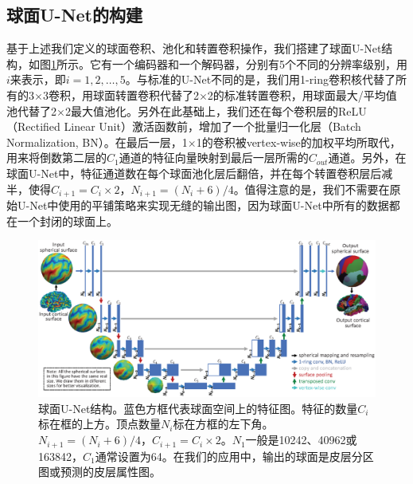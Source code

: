\subsection{球面U-Net的构建}\label{sec:球面U-Net的构建}
基于上述我们定义的球面卷积、池化和转置卷积操作，我们搭建了球面U-Net结构，如图\ref{fig:fig_unet}所示。它有一个编码器和一个解码器，分别有5个不同的分辨率级别，用$i$来表示，即$i=1,2,\dots,5$。与标准的U-Net\cite{ronneberger2015u}不同的是，我们用1-ring卷积核代替了所有的3$\times$3卷积，用球面转置卷积代替了2$\times$2的标准转置卷积，用球面最大/平均值池代替了2$\times$2最大值池化。另外在此基础上，我们还在每个卷积层的ReLU（Rectified Linear Unit）激活函数前，增加了一个批量归一化层（Batch Normalization, BN）。在最后一层，1$\times$1的卷积被vertex-wise的加权平均所取代，用来将倒数第二层的$C_1$通道的特征向量映射到最后一层所需的$C_{out}$通道。另外，在球面U-Net中，特征通道数在每个球面池化层后翻倍，并在每个转置卷积层后减半，使得$C_{i+1}=C_i\times 2$，$N_{i+1}=(N_i+6)/4$。值得注意的是，我们不需要在原始U-Net\cite{ronneberger2015u}中使用的平铺策略来实现无缝的输出图，因为球面U-Net中所有的数据都在一个封闭的球面上。

\begin{figure}[t]
	\centering
	\includegraphics[width=\linewidth]{figure/figure_unet.eps}
	\caption{球面U-Net结构。蓝色方框代表球面空间上的特征图。特征的数量$C_i$标在框的上方。顶点数量$N_i$标在方框的左下角。$N_{i+1}=(N_i+6)/4$，$C_{i+1}=C_i\times 2$。$N_1$一般是10242、40962或163842，$C_1$通常设置为64。在我们的应用中，输出的球面是皮层分区图或预测的皮层属性图。}
	\label{fig:fig_unet}
\end{figure}

